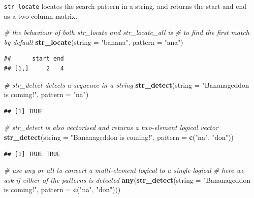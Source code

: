 \documentclass[]{book}
\newenvironment{Shaded}{}{}
\newcommand{\CommentTok}[1]{\textcolor[rgb]{0.38,0.63,0.69}{\textit{#1}}}
\newcommand{\DataTypeTok}[1]{\textcolor[rgb]{0.56,0.13,0.00}{#1}}
\newcommand{\KeywordTok}[1]{\textcolor[rgb]{0.00,0.44,0.13}{\textbf{#1}}}
\newcommand{\NormalTok}[1]{#1}
\newcommand{\StringTok}[1]{\textcolor[rgb]{0.25,0.44,0.63}{#1}}
\begin{document}
\texttt{str\_locate} locates the search pattern in a string, and returns the start and end as a two column matrix.

\begin{Shaded}
\begin{Highlighting}[]
\CommentTok{# the behaviour of both str_locate and str_locate_all is}
\CommentTok{# to find the first match by default}
\KeywordTok{str_locate}\NormalTok{(}\DataTypeTok{string =} \StringTok{"banana"}\NormalTok{, }\DataTypeTok{pattern =} \StringTok{"ana"}\NormalTok{)}
\end{Highlighting}
\end{Shaded}

\begin{verbatim}
##      start end
## [1,]     2   4
\end{verbatim}

\begin{Shaded}
\begin{Highlighting}[]
\CommentTok{# str_detect detects a sequence in a string}
\KeywordTok{str_detect}\NormalTok{(}\DataTypeTok{string =} \StringTok{"Bananageddon is coming!"}\NormalTok{,}
           \DataTypeTok{pattern =} \StringTok{"na"}\NormalTok{)}
\end{Highlighting}
\end{Shaded}

\begin{verbatim}
## [1] TRUE
\end{verbatim}

\begin{Shaded}
\begin{Highlighting}[]
\CommentTok{# str_detect is also vectorised and returns a two-element logical vector}
\KeywordTok{str_detect}\NormalTok{(}\DataTypeTok{string =} \StringTok{"Bananageddon is coming!"}\NormalTok{,}
           \DataTypeTok{pattern =} \KeywordTok{c}\NormalTok{(}\StringTok{"na"}\NormalTok{, }\StringTok{"don"}\NormalTok{))}
\end{Highlighting}
\end{Shaded}

\begin{verbatim}
## [1] TRUE TRUE
\end{verbatim}

\begin{Shaded}
\begin{Highlighting}[]
\CommentTok{# use any or all to convert a multi-element logical to a single logical}
\CommentTok{# here we ask if either of the patterns is detected}
\KeywordTok{any}\NormalTok{(}\KeywordTok{str_detect}\NormalTok{(}\DataTypeTok{string =} \StringTok{"Bananageddon is coming!"}\NormalTok{,}
               \DataTypeTok{pattern =} \KeywordTok{c}\NormalTok{(}\StringTok{"na"}\NormalTok{, }\StringTok{"don"}\NormalTok{)))}
\end{Highlighting}
\end{Shaded}
\end{document}
